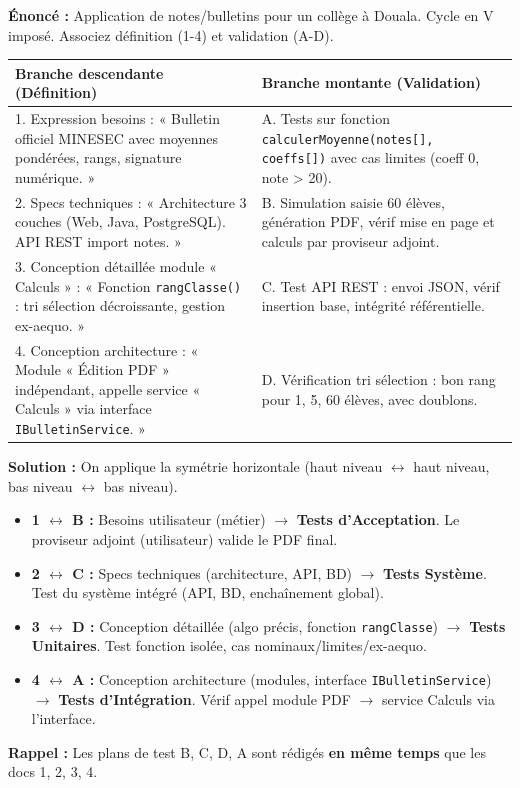 \documentclass[11pt]{article}
\begin{document}
\begin{exoresolu}
\textbf{Énoncé :} Application de notes/bulletins pour un collège à Douala. Cycle en V imposé. Associez définition (1-4) et validation (A-D).
\begin{center}
\begin{tabularx}{\linewidth}{|X|X|}
\hline
\textbf{Branche descendante (Définition)} & \textbf{Branche montante (Validation)} \\
\hline
1. Expression besoins : « Bulletin officiel MINESEC avec moyennes pondérées, rangs, signature numérique. » & A. Tests sur fonction \texttt{calculerMoyenne(notes[], coeffs[])} avec cas limites (coeff 0, note > 20). \\
\hline
2. Specs techniques : « Architecture 3 couches (Web, Java, PostgreSQL). API REST import notes. » & B. Simulation saisie 60 élèves, génération PDF, vérif mise en page et calculs par proviseur adjoint. \\
\hline
3. Conception détaillée module « Calculs » : « Fonction \texttt{rangClasse()} : tri sélection décroissante, gestion ex-aequo. » & C. Test API REST : envoi JSON, vérif insertion base, intégrité référentielle. \\
\hline
4. Conception architecture : « Module « Édition PDF » indépendant, appelle service « Calculs » via interface \texttt{IBulletinService}. » & D. Vérification tri sélection : bon rang pour 1, 5, 60 élèves, avec doublons. \\
\hline
\end{tabularx}
\end{center}
\tcblower
\textbf{Solution :} On applique la symétrie horizontale (haut niveau $\leftrightarrow$ haut niveau, bas niveau $\leftrightarrow$ bas niveau).
\begin{itemize}
    \item \textbf{1 $\leftrightarrow$ B :} Besoins utilisateur (métier) $\rightarrow$ \textbf{Tests d'Acceptation}. Le proviseur adjoint (utilisateur) valide le PDF final.
    \item \textbf{2 $\leftrightarrow$ C :} Specs techniques (architecture, API, BD) $\rightarrow$ \textbf{Tests Système}. Test du système intégré (API, BD, enchaînement global).
    \item \textbf{3 $\leftrightarrow$ D :} Conception détaillée (algo précis, fonction \texttt{rangClasse}) $\rightarrow$ \textbf{Tests Unitaires}. Test fonction isolée, cas nominaux/limites/ex-aequo.
    \item \textbf{4 $\leftrightarrow$ A :} Conception architecture (modules, interface \texttt{IBulletinService}) $\rightarrow$ \textbf{Tests d'Intégration}. Vérif appel module PDF $\rightarrow$ service Calculs via l'interface.
\end{itemize}
\textbf{Rappel :} Les plans de test B, C, D, A sont rédigés \textbf{en même temps} que les docs 1, 2, 3, 4.
\end{exoresolu}
\end{document}
